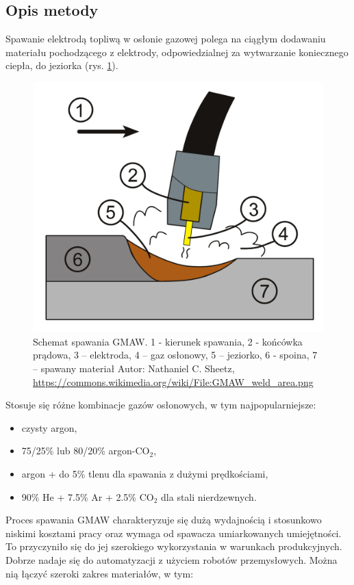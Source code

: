 \documentclass{mwart}
\begin{document}
\subsection{Opis metody}
Spawanie elektrodą topliwą w osłonie gazowej polega na ciągłym dodawaniu materiału pochodzącego z elektrody, odpowiedzialnej za wytwarzanie koniecznego ciepła, do jeziorka (rys. \ref{fig:schemat_gmaw}). 
\begin{figure}[ht]
    \centering
    \includegraphics[width=\linewidth]{GMAW_weld_area.png}
    \caption{Schemat spawania GMAW. 1 - kierunek spawania, 2 - końcówka prądowa, 3 – elektroda, 4 – gaz osłonowy, 5 – jeziorko,  6 - spoina, 7 – spawany materiał {\scriptsize Autor: Nathaniel C. Sheetz, \url{https://commons.wikimedia.org/wiki/File:GMAW_weld_area.png}}}
    \label{fig:schemat_gmaw}
\end{figure}
Stosuje się różne kombinacje gazów osłonowych, w tym najpopularniejsze:
\begin{itemize}
    \item czysty argon,
    \item 75/25\% lub 80/20\% argon-CO$_2$,
    \item argon + do 5\% tlenu dla spawania z dużymi prędkościami,
    \item 90\% He + 7.5\% Ar + 2.5\% CO$_2$ dla stali nierdzewnych.
\end{itemize}
Proces spawania GMAW charakteryzuje się dużą wydajnością i stosunkowo niskimi kosztami pracy oraz wymaga od spawacza umiarkowanych umiejętności. To przyczyniło się do jej szerokiego wykorzystania w warunkach produkcyjnych. Dobrze nadaje się do automatyzacji z użyciem robotów przemysłowych. Można nią łączyć szeroki zakres materiałów, w tym:
\end{document}
